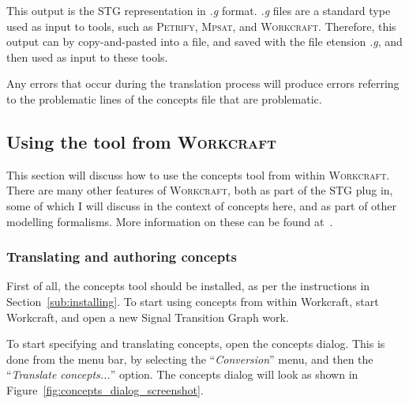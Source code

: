 \documentclass[british,conference,compsoc]{IEEEtran}
\newcommand{\noun}[1]{\textsc{#1}}
\begin{document}
This output is the STG representation in \emph{.g} format. \emph{.g} files are 
a standard type used as input to tools, such as \noun{Petrify}, \noun{Mpsat}, 
and \noun{Workcraft}. Therefore, this output can by copy-and-pasted into a file,
and saved with the file etension \emph{.g}, and then used as input to these 
tools. 

Any errors that occur during the translation process will produce errors 
referring to the problematic lines of the concepts file that are problematic. 

\subsection{Using the tool from \noun{Workcraft} \label{sec:workcraft_usage}}

This section will discuss how to use the concepts tool from within
\noun{Workcraft}. There are many other features of \noun{Workcraft}, both as 
part of the STG plug in, some of which I will discuss in the context of 
concepts here, and as part of other modelling formalisms. More information on 
these can be found at~\cite{Workcraft_website}.
 
\subsubsection{Translating and authoring concepts}

First of all, the concepts tool should be installed, as per the instructions in
Section~\ref{sub:installing}. To start using concepts from within Workcraft, 
start Workcraft, and open a new Signal Transition Graph work. 

To start specifying and translating concepts, open the concepts dialog.  This is
done from the menu bar, by selecting the ``\emph{Conversion}'' menu, and then
the ``\emph{Translate concepts...}'' option. The concepts dialog will look as 
shown in Figure~\ref{fig:concepts_dialog_screenshot}.
\end{document}
